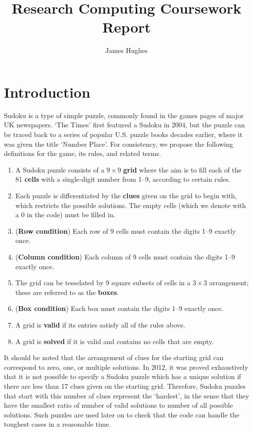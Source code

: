 \documentclass[12pt]{article}
\title{Research Computing Coursework Report}
\author{James Hughes}
\begin{document}
\maketitle
\newpage

\section*{Introduction}

Sudoku is a type of simple puzzle, commonly found in the games pages of major UK newspapers.
`The Times' first featured a Sudoku in 2004, but the puzzle can be traced back to a series of popular U.S. puzzle books decades earlier, where it was given the title `Number Place'\cite{sudoku}.
For consistency, we propose the following definitions for the game, its rules, and related terms.

\begin{enumerate}
    \item A Sudoku puzzle consists of a $9\times9$ \textbf{grid} where the aim is to fill each of the 81 \textbf{cells} with a single-digit number from 1--9, according to certain rules.
    \item Each puzzle is differentiated by the \textbf{clues} given on the grid to begin with, which restricts the possible solutions. The empty cells (which we denote with a $0$ in the code) must be filled in.
    \item (\textbf{Row condition}) Each row of 9 cells must contain the digits 1--9 exactly once.
    \item (\textbf{Column condition}) Each column of 9 cells must contain the digits 1--9 exactly once.
    \item The grid can be tesselated by 9 square subsets of cells in a $3\times3$ arrangement; these are referred to as the \textbf{boxes}.
    \item (\textbf{Box condition}) Each box must contain the digits 1--9 exactly once.
    \item A grid is \textbf{valid} if its entries satisfy all of the rules above.
    \item A grid is \textbf{solved} if it is valid and contains no cells that are empty.
\end{enumerate}

It should be noted that the arrangement of clues for the starting grid can correspond to zero, one, or multiple solutions.
In 2012, it was proved exhaustively that it is not possible to specify a Sudoku puzzle which has a unique solution if there are less than 17 clues given on the starting grid\cite{17min}.
Therefore, Sudoku puzzles that start with this number of clues represent the `hardest', in the sense that they have the smallest ratio of number of valid solutions to number of all possible solutions.
Such puzzles are used later on to check that the code can handle the toughest cases in a reasonable time.
\end{document}
